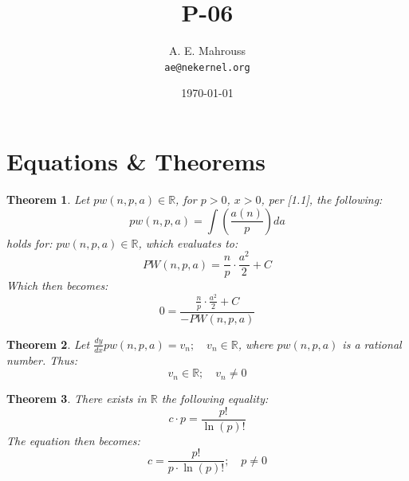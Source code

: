 \documentclass[11pt, a4paper]{article}
\title{P-06}
\author{A. E. Mahrouss\\\texttt{ae@nekernel.org}}
\date{\today}
\theoremstyle{plain}
\newtheorem{theorem}{Theorem}[section]
\theoremstyle{definition}
\theoremstyle{remark}
\begin{document}
\twocolumn[{%
  \maketitle
  \vspace{-0.5em}
  \vspace{0.8em}
  \rule{\linewidth}{0.4pt}
  \vspace{1em}
}]

\maketitle

\section{Equations \& Theorems}

\begin{theorem}
  Let $pw(n, p, a) \in \mathbb{R}$, for $p > 0$, $x > 0$, per [1.1], the following:
  \begin{equation}
    pw(n, p, a) = \int (\frac{a(n)}{p}) da
  \end{equation}
  holds for: $pw(n, p, a) \in \mathbb{R}$, which evaluates to:
  \begin{equation}
    PW(n, p, a) = \frac{n}{p}\cdot \frac{a^2}{2}+C
  \end{equation}
  Which then becomes:
  \begin{equation}
    0 = \frac{\frac{n}{p}\cdot \frac{a^2}{2}+C}{-PW(n, p, a)}
  \end{equation}
\end{theorem}

\begin{theorem}
  Let $\frac{dy}{dx}pw(n, p, a) = v_{n}; \quad v_{n} \in \mathbb{R}$, where $ pw(n, p, a) $ is a rational number. Thus:
  \begin{equation}
    v_{n} \in \mathbb{R}; \quad v_{n}\neq 0
  \end{equation}
\end{theorem}

\begin{theorem}
  There exists in $\mathbb{R}$ the following equality:
  \begin{equation}
    c \cdot p = \frac{p!}{\ln \left(p\right)!}
  \end{equation}
  The equation then becomes:
  \begin{equation}
    c = \frac{p!}{p \cdot \ln \left(p\right)!}; \quad p \neq 0
  \end{equation}
\end{theorem}
\end{document}
